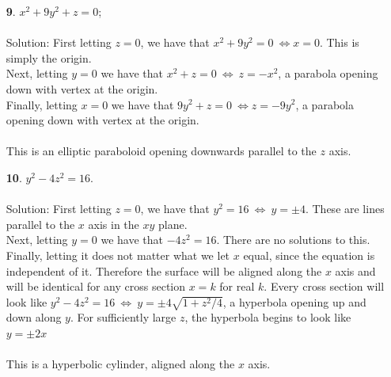 \documentclass[12pt]{amsbook}
\begin{document}
\begin{enumerate}
{\sc Solution}: First letting $z=0$, we have that $x^2=0 \ \Leftrightarrow x=0$. This is the $y$ axis.
\\
Next, it does not matter what $y$ we choose, for the surface is independent of $y$. Therefore at every cross section $y=k$ for real $k$, the surface will be identical. At every such cross section, the surface looks like $x^2+z=0 \ \Leftrightarrow  \ z=-x^2$, a parabola opening down with vertex at the origin.
\\
Finally, letting $x=0$ we have that $z=0$. This the $y$ axis once again.
\\
\\
This is parabolic cylinder, parallel to the $y$ axis.
\\
\item[{\small\bf 9}.]\quad  $x^2+9y^2+z=0$;
\\
\\
{\sc Solution}: First letting $z=0$, we have that $x^2+9y^2=0 \ \Leftrightarrow x=0$. This is simply the origin.
\\
Next, letting $y=0$ we have that $x^2+z=0 \ \Leftrightarrow  \ z=-x^2$, a parabola opening down with vertex at the origin.
\\
Finally, letting $x=0$ we have that $9y^2+z=0 \ \Leftrightarrow z=-9y^2$, a parabola opening down with vertex at the origin.
\\
\\
This is an elliptic paraboloid opening downwards parallel to the $z$ axis.
\\
\item[{\small\bf 10}.]\quad  $y^2-4z^2=16$.
\\
\\
{\sc Solution}: First letting $z=0$, we have that $y^2=16 \ \Leftrightarrow \ y=\pm 4$. These are lines parallel to the $x$ axis in the $xy$ plane. 
\\
Next, letting $y=0$ we have that $-4z^2=16$. There are no solutions to this.
\\
Finally, letting it does not matter what we let $x$ equal, since the equation is independent of it. Therefore the surface will be aligned along the $x$ axis and will be identical for any cross section $x=k$ for real $k$. Every cross section will look like $y^2-4z^2=16 \ \Leftrightarrow \ y=\pm 4\sqrt{1+z^2/4}$, a hyperbola opening up and down along $y$. For sufficiently large $z$, the hyperbola begins to look like $y=\pm 2x$ 
\\
\\
This is a hyperbolic cylinder, aligned along the $x$ axis.
\\
\end{enumerate}  
\end{document}
